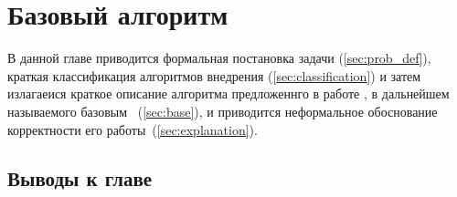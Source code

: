 \chapter{Базовый алгоритм}

В данной главе приводится формальная постановка задачи (\ref{sec:prob_def}), 
краткая классификация алгоритмов внедрения (\ref{sec:classification}) и затем
излагаеися краткое описание алгоритма предложеннго в работе \cite{Ohbuchi}, в дальнейшем называемого базовым~ 
(\ref{sec:base}), и приводится неформальное обоснование корректности его работы~(\ref{sec:explanation}).





\section{Выводы к главе}
